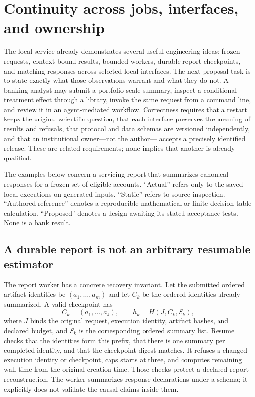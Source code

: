 \section{Continuity across jobs, interfaces, and ownership}
\label{exec17:integration-continuity}

The local service already demonstrates several useful engineering ideas:
frozen requests, context-bound results, bounded workers, durable report
checkpoints, and matching responses across selected local interfaces. The next
proposal task is to state exactly what those observations warrant and what they
do not. A banking analyst may submit a portfolio-scale summary, inspect a
conditional treatment effect through a library, invoke the same request from a
command line, and review it in an agent-mediated workflow. Correctness requires
that a restart keeps the original scientific question, that each interface
preserves the meaning of results and refusals, that protocol and data schemas
are versioned independently, and that an institutional owner—not the author—
accepts a precisely identified release. These are related requirements; none
implies that another is already qualified.

The examples below concern a servicing report that summarizes canonical
responses for a frozen set of eligible accounts. “Actual” refers only to the
saved local executions on generated inputs. “Static” refers to source
inspection. “Authored reference” denotes a reproducible mathematical or finite
decision-table calculation. “Proposed” denotes a design awaiting its stated
acceptance tests. None is a bank result.~\citep{exec16_parity_observed,exec14_failure_observations}

\subsection{A durable report is not an arbitrary resumable estimator}
\label{exec17:continuity-jobs}

The report worker has a concrete recovery invariant. Let the submitted ordered
artifact identities be $(a_1,\ldots,a_m)$ and let $C_k$ be the ordered
identities already summarized. A valid checkpoint has
\[
 C_k=(a_1,\ldots,a_k),\qquad
 h_k=H(J,C_k,S_k),
\]
where $J$ binds the original request, execution identity, artifact hashes,
and declared budget, and $S_k$ is the corresponding ordered summary list.
Resume checks that the identities form this prefix, that there is one summary
per completed identity, and that the checkpoint digest matches. It refuses a
changed execution identity or checkpoint, caps starts at three, and computes
remaining wall time from the original creation time. Those checks protect a
declared report reconstruction. The worker summarizes response declarations
under a schema; it explicitly does not validate the causal claims inside them.
\citep{exec14_failure_implementation}


